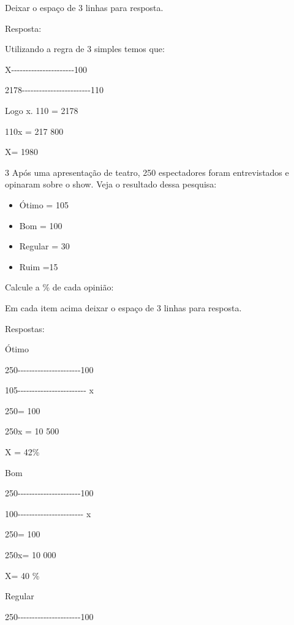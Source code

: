 Deixar o espaço de 3 linhas para resposta.

Resposta:

Utilizando a regra de 3 simples temos que:

X-\/-\/-\/-\/-\/-\/-\/-\/-\/-\/-\/-\/-\/-\/-\/-\/-\/-\/-\/-\/-\/-100

2178-\/-\/-\/-\/-\/-\/-\/-\/-\/-\/-\/-\/-\/-\/-\/-\/-\/-\/-\/-\/-\/-\/-\/-110

Logo x. 110 = 2178

110x = 217 800

X= 1980

\num{3} Após uma apresentação de teatro, 250 espectadores foram entrevistados
e opinaram sobre o show. Veja o resultado dessa pesquisa:

\begin{itemize}

\item 
  Ótimo = 105

\item 
  Bom = 100

\item 
  Regular = 30

\item 
  Ruim =15
\end{itemize}

Calcule a \% de cada opinião:

Em cada item acima deixar o espaço de 3 linhas para resposta.

Respostas:

Ótimo

250-\/-\/-\/-\/-\/-\/-\/-\/-\/-\/-\/-\/-\/-\/-\/-\/-\/-\/-\/-\/-\/-100

105-\/-\/-\/-\/-\/-\/-\/-\/-\/-\/-\/-\/-\/-\/-\/-\/-\/-\/-\/-\/-\/-\/-\/-
x

250\times \times = 100

250x = 10 500

X = 42\%

Bom

250-\/-\/-\/-\/-\/-\/-\/-\/-\/-\/-\/-\/-\/-\/-\/-\/-\/-\/-\/-\/-\/-100

100-\/-\/-\/-\/-\/-\/-\/-\/-\/-\/-\/-\/-\/-\/-\/-\/-\/-\/-\/-\/-\/-\/- x

250\times \times = 100

250x= 10 000

X= 40 \%

Regular

250-\/-\/-\/-\/-\/-\/-\/-\/-\/-\/-\/-\/-\/-\/-\/-\/-\/-\/-\/-\/-\/-100


